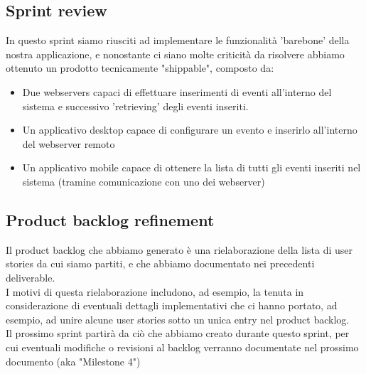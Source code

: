 \documentclass{article}
\begin{document}
\subsection{Sprint review}
In questo sprint siamo riusciti ad implementare le funzionalità 'barebone' della nostra applicazione, e nonostante ci siano molte criticità da risolvere abbiamo ottenuto un prodotto tecnicamente "shippable", composto da:
\begin{itemize}
	\item Due webservers capaci di effettuare inserimenti di eventi all'interno del sistema e successivo 'retrieving' degli eventi inseriti.
	\item Un applicativo desktop capace di configurare un evento e inserirlo all'interno del webserver remoto
	\item Un applicativo mobile capace di ottenere la lista di tutti gli eventi inseriti nel sistema (tramine comunicazione con uno dei webserver)

\end{itemize}

\subsection{Product backlog refinement}
Il product backlog che abbiamo generato è una rielaborazione della lista di user stories da cui siamo partiti, e che abbiamo documentato nei precedenti deliverable.\\
I motivi di questa rielaborazione includono, ad esempio, la tenuta in considerazione di eventuali dettagli implementativi che ci hanno portato, ad esempio, ad unire alcune user stories sotto un unica entry nel product backlog.\\
Il prossimo sprint partirà da ciò che abbiamo creato durante questo sprint, per cui eventuali modifiche o revisioni al backlog verranno documentate nel prossimo documento (aka "Milestone 4")
\end{document}
